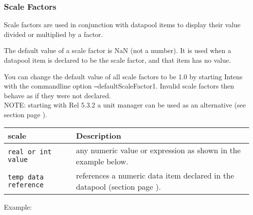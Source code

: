 \newpage
\subsubsection{Scale Factors}
\label{sec:scale}
Scale factors are used in conjunction with datapool items to display their
value divided or multiplied by a factor.

The default value of a scale factor is NaN (not a number).
It is used when a datapool item is declared to be the scale factor, and that
item has no value.

You can change the default value of all scale factors to be 1.0 by starting
Intens with the commandline option \texttt{--}defaultScaleFactor1. Invalid scale factors then
behave as if they were not declared. \\

NOTE: starting with Rel 5.3.2 a unit manager can be used as an alternative
(see section  page \pageref{sec:unitmanager}).



\begin{tabularx}{\textwidth}{l|X}
scale                       & Description \\
\hline
\verb+real or int value+   & any numeric value or expression as shown in the example below. \\
\verb+temp data reference+ & references a numeric data item declared in the datapool
                             (section \nameref{sec:tempdatareference} page \pageref{sec:tempdatareference}). \\
\end{tabularx}

Example:

